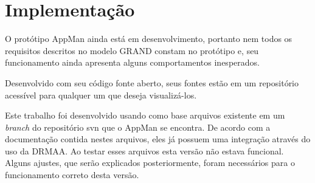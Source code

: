 \chapter{Implementação}
\label{cap:implementacao}

O protótipo AppMan ainda está em desenvolvimento, portanto nem todos os requisitos descritos no modelo GRAND constam no protótipo e, seu funcionamento ainda apresenta alguns comportamentos inesperados. 

Desenvolvido com seu código fonte aberto, seus fontes estão em um repositório acessível para qualquer um que deseja visualizá-los.

Este trabalho foi desenvolvido usando como base arquivos existente em um \emph{branch} do repositório svn que o AppMan se encontra. De acordo com a documentação contida nestes arquivos, eles já possuem uma integração através do uso da DRMAA. Ao testar esses arquivos esta versão não estava funcional. Alguns ajustes, que serão explicados posteriormente, foram necessários para o funcionamento correto desta versão.



 

